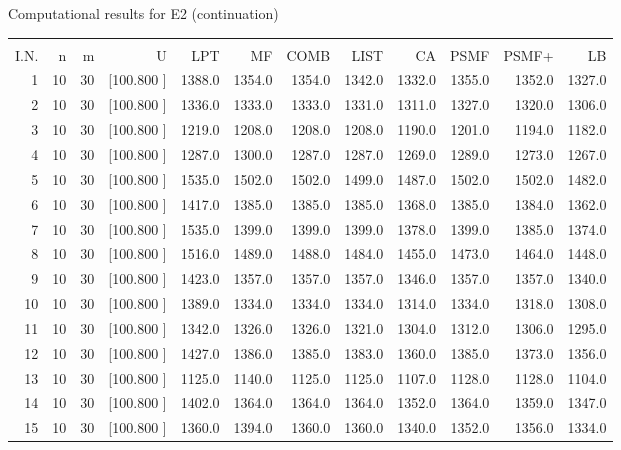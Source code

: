\documentclass[12pt,a4paper]{article}
\begin{document}
\begin{center}
 Computational results for E2 (continuation) {\tiny
\begin{tabular}{r r r r r r r r r r r r}\hline
    &   &   &          &        &        &        &        &        &        &        &       \\[-0.1in]
  I.N.  &  n  &  m  &  U  &  LPT  &  MF  &  COMB  &  LIST  &  CA  & PSMF &PSMF+ & LB \\[0.03in]
\hline
   1& 10& 30&[100.800   ]&  1388.0&  1354.0&  1354.0&  1342.0&  1332.0&  1355.0&  1352.0&  1327.0\\[-0.02in]
   2& 10& 30&[100.800   ]&  1336.0&  1333.0&  1333.0&  1331.0&  1311.0&  1327.0&  1320.0&  1306.0\\[-0.02in]
   3& 10& 30&[100.800   ]&  1219.0&  1208.0&  1208.0&  1208.0&  1190.0&  1201.0&  1194.0&  1182.0\\[-0.02in]
   4& 10& 30&[100.800   ]&  1287.0&  1300.0&  1287.0&  1287.0&  1269.0&  1289.0&  1273.0&  1267.0\\[-0.02in]
   5& 10& 30&[100.800   ]&  1535.0&  1502.0&  1502.0&  1499.0&  1487.0&  1502.0&  1502.0&  1482.0\\[-0.02in]
   6& 10& 30&[100.800   ]&  1417.0&  1385.0&  1385.0&  1385.0&  1368.0&  1385.0&  1384.0&  1362.0\\[-0.02in]
   7& 10& 30&[100.800   ]&  1535.0&  1399.0&  1399.0&  1399.0&  1378.0&  1399.0&  1385.0&  1374.0\\[-0.02in]
   8& 10& 30&[100.800   ]&  1516.0&  1489.0&  1488.0&  1484.0&  1455.0&  1473.0&  1464.0&  1448.0\\[-0.02in]
   9& 10& 30&[100.800   ]&  1423.0&  1357.0&  1357.0&  1357.0&  1346.0&  1357.0&  1357.0&  1340.0\\[-0.02in]
  10& 10& 30&[100.800   ]&  1389.0&  1334.0&  1334.0&  1334.0&  1314.0&  1334.0&  1318.0&  1308.0\\[-0.02in]
  11& 10& 30&[100.800   ]&  1342.0&  1326.0&  1326.0&  1321.0&  1304.0&  1312.0&  1306.0&  1295.0\\[-0.02in]
  12& 10& 30&[100.800   ]&  1427.0&  1386.0&  1385.0&  1383.0&  1360.0&  1385.0&  1373.0&  1356.0\\[-0.02in]
  13& 10& 30&[100.800   ]&  1125.0&  1140.0&  1125.0&  1125.0&  1107.0&  1128.0&  1128.0&  1104.0\\[-0.02in]
  14& 10& 30&[100.800   ]&  1402.0&  1364.0&  1364.0&  1364.0&  1352.0&  1364.0&  1359.0&  1347.0\\[-0.02in]
  15& 10& 30&[100.800   ]&  1360.0&  1394.0&  1360.0&  1360.0&  1340.0&  1352.0&  1356.0&  1334.0\\[-0.02in]

\end{tabular}}
\end{center}
\end{document}
